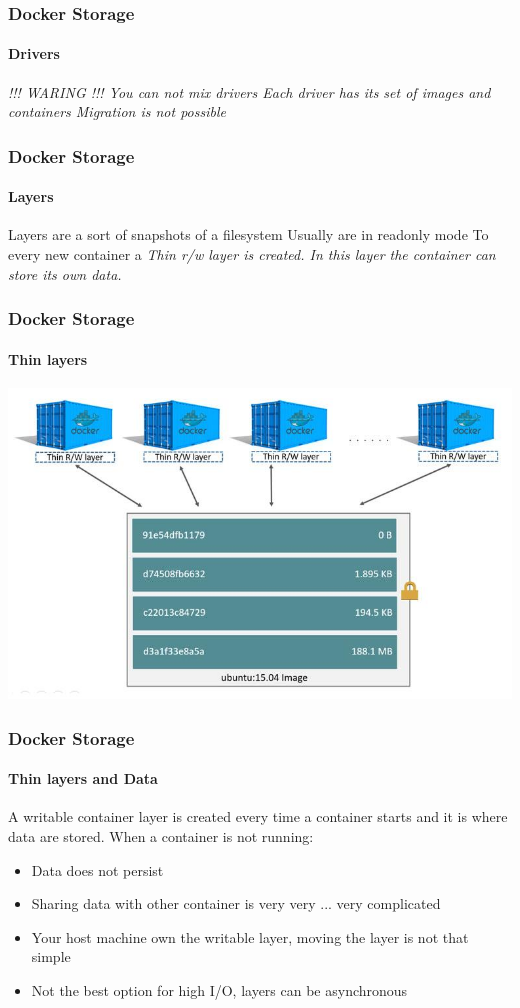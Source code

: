 \begin{frame}
\frametitle{Docker Storage}
\framesubtitle{Drivers}
\it{!!! WARING !!!}
\vspace{0.4cm}
You can not mix drivers
\vspace{0.4cm}
Each driver has its set of images and containers
\vspace{0.4cm}
Migration is not possible
\end{frame}


\begin{frame}
\frametitle{Docker Storage}
\framesubtitle{Layers}
Layers are a sort of snapshots of a filesystem
\vspace{0.4cm}
Usually are in readonly mode
\vspace{0.4cm}
To every new container a \it{Thin} r/w layer is created. In this layer the container can store its own data.
\end{frame}

\begin{frame}
\frametitle{Docker Storage}
\framesubtitle{Thin layers}
\includegraphics[width=0.5\columnwidth]{./Figure/docker-065-047}
\end{frame}


\begin{frame}
\frametitle{Docker Storage}
\framesubtitle{Thin layers and Data}
A writable container layer is created every time a container starts and it is where data are stored.
\vspace{0.4cm}
When a container is not running:
\begin{itemize}
\item Data does not persist
\item Sharing data with other container is very very ... very complicated
\item Your host machine own the writable layer, moving the layer is not that simple
\item Not the best option for high I/O, layers can be asynchronous 
\end{itemize}
\end{frame}

